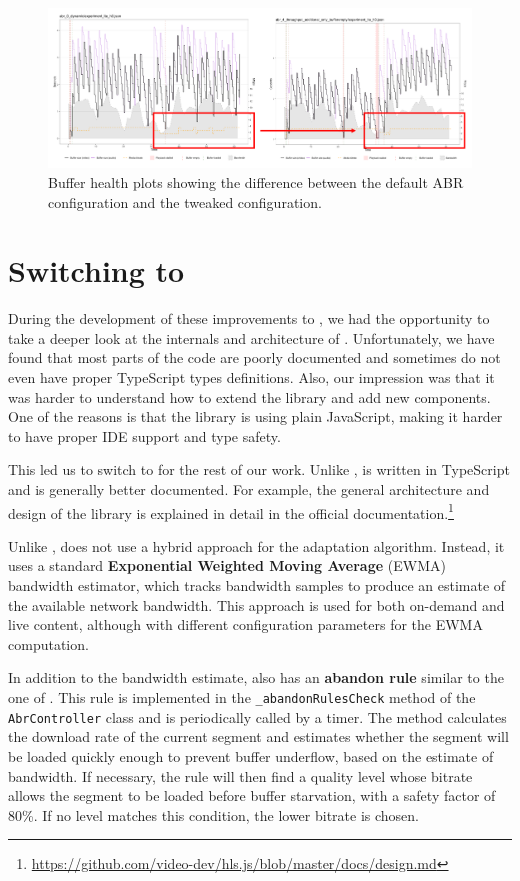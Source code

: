 \begin{figure}[h]
    \centering
    \includegraphics[width=\textwidth]{res/impr_dashjs.png}
    \caption{Buffer health plots showing the difference between the default \dashjs{} ABR configuration and the tweaked configuration.}
    \label{fig:improvements_dashjs}
\end{figure}

\section{Switching to \hlsjs{}}
\label{sec:improvements/hlsjs}

During the development of these improvements to  \dashjs{}, we had the opportunity to take a deeper look at the internals and architecture of \dashjs{}. Unfortunately, we have found that most parts of the code are poorly documented and sometimes do not even have proper TypeScript types definitions. Also, our impression was that it was harder to understand how to extend the library and add new components. One of the reasons is that the library is using plain JavaScript, making it harder to have proper IDE support and type safety.

This led us to switch to \hlsjs{} for the rest of our work. Unlike \dashjs{}, \hlsjs{} is written in TypeScript and is generally better documented. For example, the general architecture and design of the library is explained in detail in the official documentation.\footnote{\url{https://github.com/video-dev/hls.js/blob/master/docs/design.md}}

Unlike \dashjs{}, \hlsjs{} does not use a hybrid approach for the adaptation algorithm. Instead, it uses a standard \textbf{Exponential Weighted Moving Average} (EWMA) bandwidth estimator, which tracks bandwidth samples to produce an estimate of the available network bandwidth. This approach is used for both on-demand and live content, although with different configuration parameters for the EWMA computation.

In addition to the bandwidth estimate, \hlsjs{} also has an \textbf{abandon rule} similar to the one of \dashjs{}. This rule is implemented in the \texttt{\_abandonRulesCheck} method of the \texttt{AbrController} class and is periodically called by a timer. The method calculates the download rate of the current segment and estimates whether the segment will be loaded quickly enough to prevent buffer underflow, based on the estimate of bandwidth. If necessary, the rule will then find a quality level whose bitrate allows the segment to be loaded before buffer starvation, with a safety factor of 80\%. If no level matches this condition, the lower bitrate is chosen.

